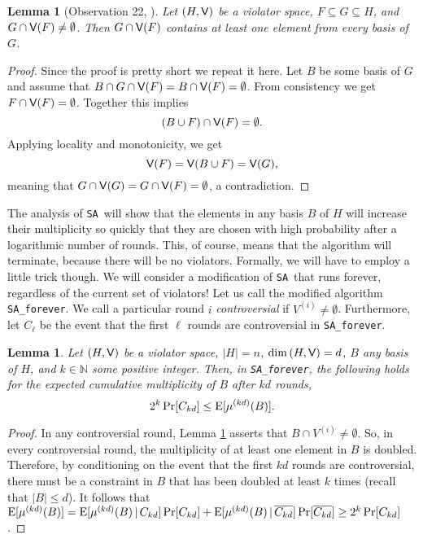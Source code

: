 \documentclass[12pt]{article}
\def\Exp{\qopname\relax m{E}}
\def\Violators{{\sf V}}
\newtheorem{lemma2}[theorem2]{Lemma}
\newenvironment{lemma}{\begin{lemma2}}{\end{lemma2}}
\theoremstyle{remark}
\def\stageII{\texttt{SA}}
\def\stageIIforever{\texttt{SA\_forever}}
\begin{document}
\begin{lemma}[Observation 22,  \cite{journals/dam/GartnerMRS08}]
\label{lemma:53b}
Let $(H, \Violators)$ be a violator space, $F\subseteq G \subseteq H$, and $G\cap\Violators(F)\neq 
\emptyset$.
Then $G\cap \Violators(F)$ contains at least one element from every basis of $G$.
\end{lemma}
\begin{proof}
Since the proof is pretty short we repeat it here.
Let $B$ be some basis of $G$ and assume that $B\cap G \cap \Violators(F) = B\cap \Violators(F) = 
\emptyset$. From consistency we get
$F\cap \Violators(F)= \emptyset$. Together this implies
\[
	(B\cup F) \cap \Violators(F) = \emptyset.
\]
Applying locality and monotonicity, we get
\[
	\Violators(F) = \Violators(B\cup F) = \Violators(G),
\]
meaning that $G\cap\Violators(G)= G\cap\Violators(F)=\emptyset$, a contradiction.
\end{proof}

The analysis of \stageII~will show that the elements in any basis $B$ of
$H$ will increase their multiplicity so quickly
that they are chosen with high probability after a logarithmic number
of rounds. This, of course, means that the algorithm will terminate, because there will be no violators.
Formally, we will have to employ a little trick though. We will consider a modification
of \stageII~that runs forever, regardless of the current set of violators! Let us call the modified algorithm \stageIIforever. We call a particular round $i$ \emph{controversial} if
$V^{(i)}\neq\emptyset$. Furthermore, let $C_\ell$ be the event that the first  $\ell$ rounds are controversial
 in \stageIIforever.

\begin{lemma}
\label{lemma:lowerbound}
Let $(H,\Violators)$ be a violator space,  $|H|=n$, $\dim{(H,\Violators)}=d$,
$B$ any basis of $H$, and $k \in \mathbb{N}$ some positive integer.
Then, in \stageIIforever, the following holds for the expected cumulative
multiplicity of $B$ after $kd$ rounds,
\[
	2^k \Pr[C_{kd}] \leq \Exp[\mu^{(kd)}(B)] .
\]
\end{lemma}
\begin{proof}
In any controversial round,
Lemma \ref{lemma:53b} asserts that $B\cap V^{(i)}\neq\emptyset$. So, in every controversial round, the 
multiplicity of at least one element in $B$ is doubled. Therefore, by conditioning on the event
that the first $kd$ rounds are controversial,
there must be a constraint in $B$ that has been doubled at least $k$ times (recall that 
$|B|\leq d$). It follows that 
$\Exp[\mu^{(k d)}(B)] = \Exp[\mu^{(k d)}(B)\,|\,C_{kd}]\Pr[C_{kd}] +
\Exp[\mu^{(k d)}(B)\,|\,\overline{C_{kd}}]\Pr[\overline{C_{kd}}]\geq 2^k \Pr[C_{kd}]$.
\end{proof}
\end{document}
